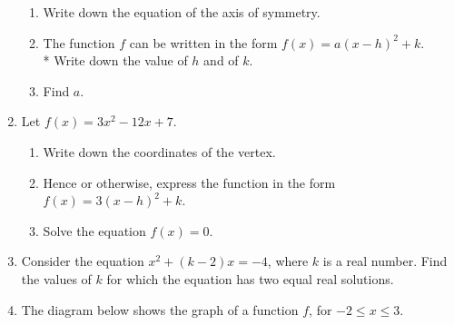 \documentclass[12pt, oneside]{article}
\begin{document}
\begin{enumerate}
\begin{figure}[!htbp]
\begin{center}
    \end{center}
    \end{figure}

    \begin{enumerate}
        \item Write down the equation of the axis of symmetry.
        \item The function $f$ can be written in the form $f(x)=a(x-h)^2 +k$. \\*
        Write down the value of $h$ and of $k$.
        \item Find $a$.
    \end{enumerate}


\item Let $f(x)=3x^2-12x+7$.
\begin{enumerate}
    \item Write down the coordinates of the vertex.
    \item Hence or otherwise, express the function in the form $f(x)=3(x-h)^2 +k$.
    \item Solve the equation  $f(x)=0$.
\end{enumerate}

\item Consider the equation $x^2 + (k-2)x=-4$, where $k$ is a real number. Find the values of $k$ for which the equation has two equal real solutions.

\newpage

\item The diagram below shows the graph of a function $f$, for $-2 \leq x \leq 3$.

    \begin{center}
\end{center}
\end{enumerate}
\end{document}

